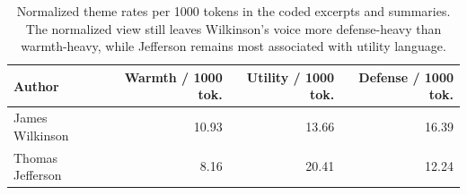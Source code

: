 \begin{table}[t]
\centering
\small
\begin{tabular}{lrrr}
\toprule
Author & Warmth / 1000 tok. & Utility / 1000 tok. & Defense / 1000 tok. \\
\midrule
James Wilkinson & 10.93 & 13.66 & 16.39 \\
Thomas Jefferson & 8.16 & 20.41 & 12.24 \\
\bottomrule
\end{tabular}
\caption{Normalized theme rates per 1000 tokens in the coded excerpts and summaries. The normalized view still leaves Wilkinson's voice more defense-heavy than warmth-heavy, while Jefferson remains most associated with utility language.}
\label{tab:themerates}
\end{table}

